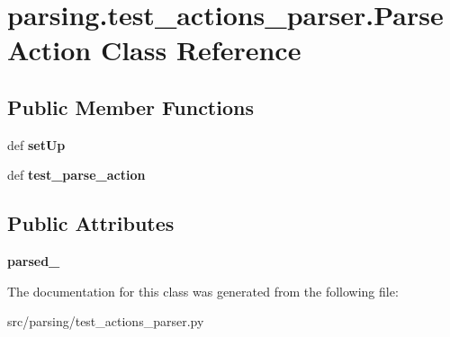 \hypertarget{classparsing_1_1test__actions__parser_1_1_parse_action}{\section{parsing.\-test\-\_\-actions\-\_\-parser.\-Parse\-Action \-Class \-Reference}
\label{classparsing_1_1test__actions__parser_1_1_parse_action}
}
\subsection*{\-Public \-Member \-Functions}
\begin{DoxyCompactItemize}
\item 
\hypertarget{classparsing_1_1test__actions__parser_1_1_parse_action_af18279802f41f78afd95ca9e37ab96aa}{def {\bfseries set\-Up}}\label{classparsing_1_1test__actions__parser_1_1_parse_action_af18279802f41f78afd95ca9e37ab96aa}

\item 
\hypertarget{classparsing_1_1test__actions__parser_1_1_parse_action_a4bfa2c5b4c03e078ebb11bd8e0c2d189}{def {\bfseries test\-\_\-parse\-\_\-action}}\label{classparsing_1_1test__actions__parser_1_1_parse_action_a4bfa2c5b4c03e078ebb11bd8e0c2d189}

\end{DoxyCompactItemize}
\subsection*{\-Public \-Attributes}
\begin{DoxyCompactItemize}
\item 
\hypertarget{classparsing_1_1test__actions__parser_1_1_parse_action_a4eadc888bfdf26d33513f09810c62c14}{{\bfseries parsed\-\_}}\label{classparsing_1_1test__actions__parser_1_1_parse_action_a4eadc888bfdf26d33513f09810c62c14}

\end{DoxyCompactItemize}


\-The documentation for this class was generated from the following file\-:\begin{DoxyCompactItemize}
\item 
src/parsing/test\-\_\-actions\-\_\-parser.\-py\end{DoxyCompactItemize}
